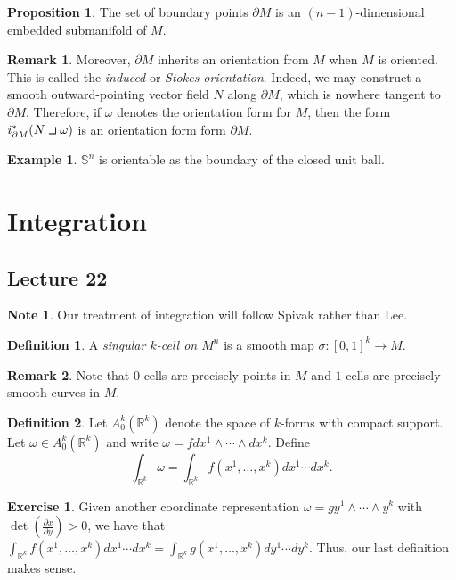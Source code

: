 \documentclass[10pt,letterpaper,cm]{nupset}
\theoremstyle{definition}
\newtheorem*{definition}{Definition}
\newtheorem{exmp}{Example}
\newtheorem{remark}{Remark}
\newtheorem*{note}{Note}
\newtheorem{exercise}{Exercise}
\newtheorem{prop}{Proposition}
\newcommand{\R}{\mathbb R}
\renewcommand{\S}{\mathbb S}
\newcommand{\1}{\mathbf{1}}
\newcommand{\0}{\vec 0}
\newcommand{\intprodl}{%
    \mathbin{\scalebox{1.5}{$\lrcorner$}}%
}
\begin{document}
\begin{prop}
The set of boundary points $\partial{M}$ is an $(n-1)$-dimensional embedded submanifold of $M$.
\end{prop}

\begin{remark}
Moreover, $\partial{M}$ inherits an orientation from $M$ when $M$ is oriented. This is called the \textit{induced} or \textit{Stokes orientation}. Indeed, we may construct a smooth  outward-pointing vector field $N$ along $\partial{M}$, which is nowhere tangent to $\partial{M}$. Therefore,  if $\omega$ denotes the orientation form for $M$, then the form $i^{\ast}_{\partial{M}}(N \intprodl \omega)$ is an orientation form form $\partial{M}$.
\end{remark}
\begin{exmp}
$\S^n$ is orientable as the boundary of the closed unit ball.
\end{exmp}

\section{Integration}

\subsection{Lecture 22}

\begin{note}
Our treatment of integration will  follow Spivak rather than Lee.
\end{note}

\begin{definition}
A \textit{singular $k$-cell on $M^n$} is a smooth map $\sigma : [0,1]^k \to M$.
\end{definition}

\begin{remark}
Note that $0$-cells are precisely points in $M$ and $1$-cells are precisely smooth curves in $M$.
\end{remark}

\begin{definition}
Let $A_0^k(\R^k)$ denote the space of $k$-forms with compact support. Let $\omega \in A_0^k(\R^k)$ and write $\omega = fdx^1\wedge \cdots \wedge dx^k$. Define $$ \int_{\R^k}\omega = \int_{\R^k} f(x^1, \ldots, x^k)dx^1\cdots dx^k  .$$
\end{definition}

\begin{exercise}
Given another coordinate representation $\omega = gy^1 \wedge \cdots \wedge y^k$ with $\det(\frac{\partial{x}}{\partial{y}}) >0$, we have that $\int_{\R^k} f(x^1, \ldots, x^k)dx^1\cdots dx^k  = \int_{\R^k} g(x^1, \ldots, x^k)dy^1\cdots dy^k.$ Thus, our last definition makes sense.
\end{exercise}
\end{document}
